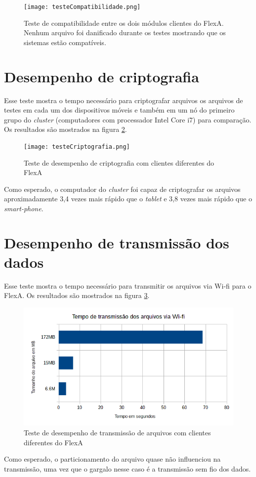     \begin{figure}[!ht]
    \centering
    \texttt{[image: testeCompatibilidade.png]}
    \caption{Teste de compatibilidade entre os dois módulos clientes do FlexA. Nenhum arquivo foi danificado durante os testes mostrando que os sistemas estão compatíveis.}
    \label{fig:testeCompatibilidade}
    \end{figure}
    
\section{Desempenho de criptografia}

    Esse teste mostra o tempo necessário para criptografar arquivos os arquivos de testes em cada um dos dispositivos móveis e também em um nó do primeiro grupo do \textit{cluster} (computadores com processador Intel Core i7) para comparação. Os resultados são mostrados na figura \ref{fig:testesCriptografia}.
    
    \begin{figure}[!ht]
    \centering
    \texttt{[image: testeCriptografia.png]}
    \caption{Teste de desempenho de criptografia com clientes diferentes do FlexA}
    \label{fig:testesCriptografia}
    \end{figure}
    
    Como esperado, o computador do \textit{cluster} foi capaz de criptografar os arquivos aproximadamente 3,4 vezes mais rápido que o \textit{tablet} e 3,8 vezes mais rápido que o \textit{smart-phone}.
    
\section{Desempenho de transmissão dos dados}

    Esse teste mostra o tempo necessário para transmitir os arquivos via Wi-fi para o FlexA. Os resultados são mostrados na figura \ref{fig:testeTransmissao}.
    
    \begin{figure}[!ht]
    \centering
    \includegraphics[width=14cm]{testeTransmissao.png}
    \caption{Teste de desempenho de transmissão de arquivos com clientes diferentes do FlexA}
    \label{fig:testeTransmissao}
    \end{figure}
    
    Como esperado, o particionamento do arquivo quase não influenciou na transmissão, uma vez que o gargalo nesse caso é a transmissão sem fio dos dados.